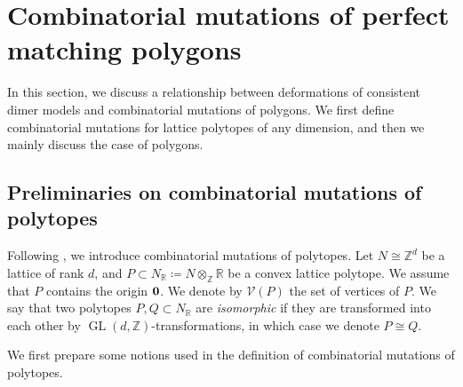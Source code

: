 \documentclass[pdftex]{sigma}%
\numberwithin{equation}{section}
\numberwithin{figure}{section}
\numberwithin{table}{section}
\newcommand{\ZZ}{\mathbb{Z}}
\newcommand{\RR}{\mathbb{R}}
\newcommand{\calV}{\mathcal{V}}
\newcommand{\GL}{\operatorname{GL}}
\begin{document}

\section{Combinatorial mutations of perfect matching polygons}\label{sec_mutation_polygon1}
In this section, we discuss a relationship between deformations of consistent dimer models and combinatorial mutations of polygons.
We first define combinatorial mutations for lattice polytopes of any dimension, and then we mainly discuss the case of polygons.

\subsection{Preliminaries on combinatorial mutations of polytopes}\label{sec_pre_mutation_polygon}

Following \cite{ACGK}, we introduce combinatorial mutations of polytopes.
Let $N\cong\ZZ^d$ be a lattice of rank $d$, and $P\subset N_\RR\coloneqq N\otimes_\ZZ\RR$ be a convex lattice polytope.
We assume that $P$ contains the origin ${\bf 0}$.
We denote by $\calV(P)$ the set of vertices of $P$.
We say that two polytopes $P,Q\subset N_\RR$ are \emph{isomorphic} if they are transformed into each other by $\GL(d,\ZZ)$-transformations, in which case we denote $P\cong Q$.

We first prepare some notions used in the definition of combinatorial mutations of polytopes.
\end{document}
